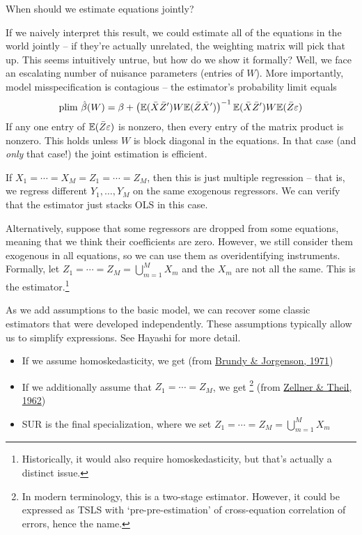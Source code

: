 \documentclass[10pt]{article}
\begin{document}
\begin{question}
	When should we estimate equations jointly?
\end{question}
\begin{answer}
	If we naively interpret this result, we could estimate all of the equations in the world jointly -- if they're actually unrelated, the weighting matrix will pick that up. This seems intuitively untrue, but how do we show it formally? Well, we face an escalating number of nuisance parameters (entries of $W$). More importantly, model misspecification is contagious -- the estimator's probability limit equals \[\text{plim } \hat{\beta}(W) = \beta + \left( \mathbb{E}(\bar{X}\bar{Z}')W\mathbb{E}(\bar{Z}\bar{X}')\right)^{-1}\mathbb{E}(\bar{X}\bar{Z}')W \mathbb{E}(\bar{Z}\varepsilon)\]If any one entry of $\mathbb{E}(\bar{Z}\varepsilon)$ is nonzero, then every entry of the matrix product is nonzero. This holds unless $W$ is block diagonal in the equations. In that case (and \emph{only} that case!) the joint estimation is efficient.
\end{answer}

\begin{example}
	 If $X_1 = \cdots = X_M = Z_1 = \cdots = Z_M$, then this is just multiple regression -- that is, we regress different $Y_1,\dots,Y_M$ on the same exogenous regressors. We can verify that the estimator just stacks OLS in this case.
	
	Alternatively, suppose that some regressors are dropped from some equations, meaning that we think their coefficients are zero. However, we still consider them exogenous in all equations, so we can use them as overidentifying instruments. Formally, let $Z_1 = \cdots = Z_M = \bigcup_{m=1}^M X_m$ and the $X_m$ are not all the same. This is the  estimator.\footnote{Historically, it would also require homoskedasticity, but that's actually a distinct issue.}
\end{example}

\begin{remark}
	As we add assumptions to the basic model, we can recover some classic estimators that were developed independently. These assumptions typically allow us to simplify expressions. See Hayashi for more detail.
	\begin{itemize}
		\item If we assume homoskedasticity, we get  (from \href{https://www.jstor.org/stable/1937965}{Brundy \& Jorgenson, 1971})
		\item If we additionally assume that $Z_1 = \cdots = Z_M$, we get \footnote{In modern terminology, this is a two-stage estimator. However, it could be expressed as TSLS with `pre-pre-estimation' of cross-equation correlation of errors, hence the name.} (from \href{https://www.jstor.org/stable/1911287}{Zellner \& Theil, 1962})
		\item SUR is the final specialization, where we set $Z_1 = \cdots = Z_M = \bigcup_{m=1}^M X_m$
	\end{itemize}
\end{remark}
\end{document}
